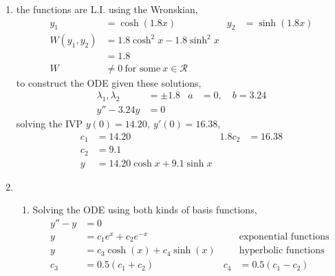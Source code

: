 \begin{enumerate}
    \item the functions are L.I. using the Wronskian,
          \begin{align}
              y_{1}           & = \cosh(1.8 x)                             &
              y_{2}           & = \sinh(1.8 x)                               \\
              W(y_{1}, y_{2}) & = 1.8\cosh^{2}x - 1.8\sinh^{2}x              \\
                              & = 1.8                                        \\
              W               & \neq 0\ \text{for some}\ x \in \mathcal{R}
          \end{align}
          to construct the ODE given these solutions,
          \begin{align}
              \lambda_{1}, \lambda_{2} & = \pm 1.8 & a & = 0, \quad b = 3.24 \\
              y'' - 3.24y              & = 0
          \end{align}
          solving the IVP $ y(0) = 14.20,\ y'(0) = 16.38 $,
          \begin{align}
              c_{1} & = 14.20                       & 1.8c_{2} & = 16.38 \\
              c_{2} & = 9.1                                              \\
              y     & = 14.20 \cosh x + 9.1 \sinh x
          \end{align}

    \item
          \begin{enumerate}
              \item Solving the ODE using both kinds of basis functions,
                    \begin{align}
                        y''  - y & = 0                               \\
                        y        & = c_{1}e^{x} + c_{2}e^{-x}      &
                                 & \text{exponential functions}      \\
                        y        & = c_{3}\cosh(x) + c_{4}\sinh(x) &
                                 & \text{hyperbolic functions}       \\
                        c_{3}    & = 0.5(c_{1} + c_{2})            &
                        c_{4}    & = 0.5(c_{1} - c_{2})
                    \end{align}


\end{enumerate}
\end{enumerate}
